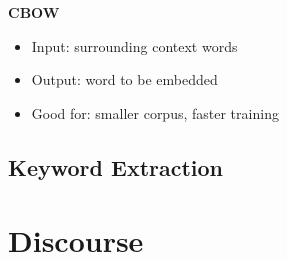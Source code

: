 \documentclass[]{article}
\begin{document}
     
     \textbf{CBOW}
     \begin{itemize}
      \item Input: surrounding context words
      \item Output: word to be embedded
      \item Good for: smaller corpus, faster training
     \end{itemize}
    
    \subsection{Keyword Extraction}
    
   
    \clearpage
	\section{Discourse}
	
	
	
	\clearpage
	
	
	
\end{document}
